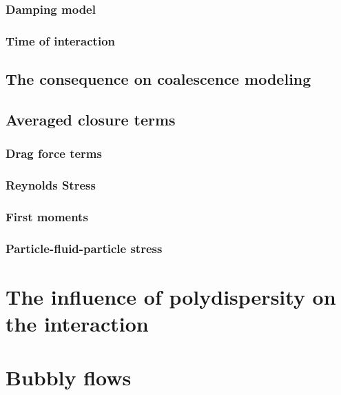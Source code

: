 \documentclass[12pt,a4paper,openany]{My_book}
\begin{document}
{\subsection{Damping model}
\subsection{Time of interaction}

\section{The consequence on coalescence modeling}

\section{Averaged closure terms}
\subsection{Drag force terms}
\subsection{Reynolds Stress}
\subsection{First moments}
\subsection{Particle-fluid-particle stress}


\chapter{The influence of polydispersity on the interaction}

\chapter{Bubbly flows }



}







\appendix
{}






% 
\end{document}
